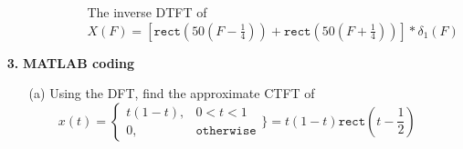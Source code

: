 \documentclass[a4paper, 12pt]{article}
\begin{document}
\begin{itemize}
\begin{itemize}
\begin{itemize}
\begin{figure}[h!]
\caption{\label{fig:2e}The inverse DTFT of $X(F) = \left[\mathtt{rect}\left(50\left(F - \frac{1}{4}\right)\right) + \mathtt{rect}\left(50\left(F + \frac{1}{4}\right)\right)\right]*\delta_{1}(F)$}
\end{figure}
\end{itemize}
\end{itemize}

\pagebreak
\item[\textbf{3.}]{\textbf{MATLAB coding}}
\begin{itemize}
\item[(a)]{Using the DFT, find the approximate CTFT of}
\[
x(t) = 
\begin{cases}
t(1-t), & 0 < t < 1 \\
0, & \mathtt{otherwise}
\end{cases}
\Biggr\rbrace= t(1-t)\mathtt{rect}\left(t - \frac{1}{2} \right)
\]

\begin{tcolorbox}[enforce breakable, pad at break = 1mm, break at=18cm,title={Source Code}]

\end{tcolorbox}


\end{itemize}
\end{itemize}
\end{document}
